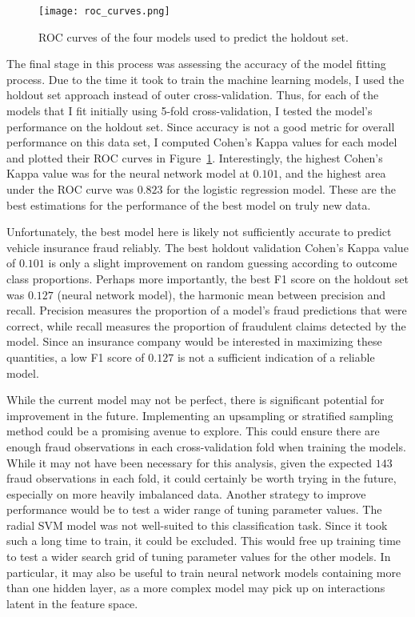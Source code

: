 \documentclass{article}
\begin{document}
\begin{figure}
    \centering
    \texttt{[image: roc\_curves.png]}
    \caption{ROC curves of the four models used to predict the holdout set.}
    \label{fig:roc}
\end{figure}

The final stage in this process was assessing the accuracy of the model fitting process.  Due to the 
time it took to train the machine learning models, I used the holdout set approach instead of outer 
cross-validation.  Thus, for each of the models that I fit initially using 5-fold cross-validation, 
I tested the model's performance on the holdout set.  Since accuracy is not a good metric for overall 
performance on this data set, I computed Cohen's Kappa values for each model and plotted their ROC 
curves in Figure~\ref{fig:roc}.  Interestingly, the highest Cohen's Kappa value was for the neural 
network model at $0.101$, and the highest area under the ROC curve was $0.823$ for the logistic 
regression model.  These are the best estimations for the performance of the best model on truly new 
data.

Unfortunately, the best model here is likely not sufficiently accurate to predict vehicle insurance 
fraud reliably.  The best holdout validation Cohen's Kappa value of $0.101$ is only a slight improvement 
on random guessing according to outcome class proportions.  Perhaps more importantly, the best F1 score 
on the holdout set was $0.127$ (neural network model), the harmonic mean between precision and recall.  
Precision measures the proportion of a model's fraud predictions that were correct, while recall measures 
the proportion of fraudulent claims detected by the model.  Since an insurance company would be interested 
in maximizing these quantities, a low F1 score of $0.127$ is not a sufficient indication of a reliable 
model.   

While the current model may not be perfect, there is significant potential for improvement in the future. 
Implementing an upsampling or stratified sampling method could be a promising avenue to explore. This 
could ensure there are enough fraud observations in each cross-validation fold when training the models. 
While it may not have been necessary for this analysis, given the expected $143$ fraud observations in 
each fold, it could certainly be worth trying in the future, especially on more heavily imbalanced data. 
Another strategy to improve performance would be to test a wider range of tuning parameter values.  The 
radial SVM model was not well-suited to this classification task.  Since it took such a long time to 
train, it could be excluded.  This would free up training time to test a wider search grid of tuning 
parameter values for the other models.  In particular, it may also be useful to train neural network 
models containing more than one hidden layer, as a more complex model may pick up on interactions latent 
in the feature space. 
  
\end{document}
